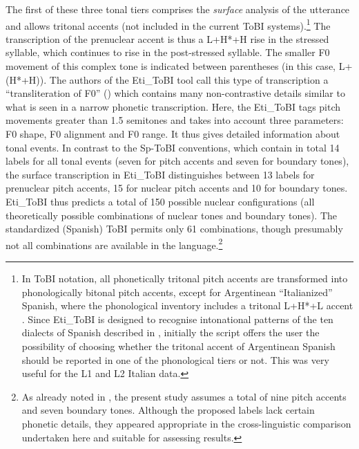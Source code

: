 The first of these three tonal tiers comprises the \textit{surface} analysis of the utterance and allows tritonal accents (not included in the current ToBI systems).\footnote{In ToBI notation, all phonetically tritonal pitch accents are transformed into phonologically bitonal pitch accents, except for Argentinean “Italianized” Spanish, where the phonological inventory includes a tritonal L+H*+L accent \citep{GabrielEtAl2010}. Since Eti\_ToBI is designed to recognise intonational patterns of the ten dialects of Spanish described in \citet{PrietoRoseano2010}, initially the script offers the user the possibility of choosing whether the tritonal accent of Argentinean Spanish should be reported in one of the phonological tiers or not. This was very useful for the L1 and L2 Italian data.} The transcription of the prenuclear accent is thus a L+H*+H rise in the stressed syllable, which continues to rise in the post-stressed syllable. The smaller F0 movement of this complex tone is indicated between parentheses (in this case, L+(H*+H)). The authors of the Eti\_ToBI tool call this type of transcription a “transliteration of F0” (\citealt[775]{Elvira-GarcíaEtAl2016}) which contains many non-contrastive details similar to what is seen in a narrow phonetic transcription. Here, the Eti\_ToBI tags pitch movements greater than 1.5 semitones and takes into account three parameters: F0 shape, F0 alignment and F0 range. It thus gives detailed information about tonal events. In contrast to the Sp-ToBI conventions, which contain in total 14 labels for all tonal events (seven for pitch accents and seven for boundary tones), the surface transcription in Eti\_ToBI distinguishes between 13 labels for prenuclear pitch accents, 15 for nuclear pitch accents and 10 for boundary tones. Eti\_ToBI thus predicts a total of 150 possible nuclear configurations (all theoretically possible combinations of nuclear tones and boundary tones). The standardized (Spanish) ToBI permits only 61 combinations, though presumably not all combinations are available in the language.\footnote{As already noted in , the present study assumes a total of nine pitch accents and seven boundary tones. Although the proposed labels lack certain phonetic details, they appeared appropriate in the cross-linguistic comparison undertaken here and suitable for assessing results.}



